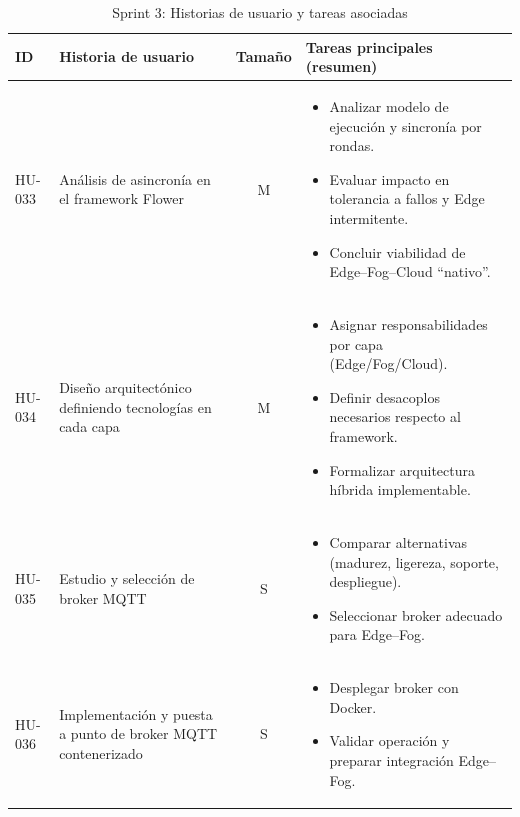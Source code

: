 \documentclass{report}
\begin{document}
\begin{table}[H]
\centering
\footnotesize
\caption{Sprint 3: Historias de usuario y tareas asociadas}
\label{tab:sprint3}
\renewcommand{\arraystretch}{1.25}
\setlength{\tabcolsep}{4pt}

\begin{tabular}{|l|p{4.6cm}|c|p{5.8cm}|}
\hline
\textbf{ID} & \textbf{Historia de usuario} & \textbf{Tamaño} & \textbf{Tareas principales (resumen)} \\ \hline

HU-033 &
Análisis de asincronía en el framework Flower &
M &
\begin{itemize}\setlength\itemsep{0.2em}
  \item Analizar modelo de ejecución y sincronía por rondas.
  \item Evaluar impacto en tolerancia a fallos y Edge intermitente.
  \item Concluir viabilidad de Edge--Fog--Cloud ``nativo''.
\end{itemize}
\\ \hline

HU-034 &
Diseño arquitectónico definiendo tecnologías en cada capa &
M &
\begin{itemize}\setlength\itemsep{0.2em}
  \item Asignar responsabilidades por capa (Edge/Fog/Cloud).
  \item Definir desacoplos necesarios respecto al framework.
  \item Formalizar arquitectura híbrida implementable.
\end{itemize}
\\ \hline

HU-035 &
Estudio y selección de broker MQTT &
S &
\begin{itemize}\setlength\itemsep{0.2em}
  \item Comparar alternativas (madurez, ligereza, soporte, despliegue).
  \item Seleccionar broker adecuado para Edge--Fog.
\end{itemize}
\\ \hline

HU-036 &
Implementación y puesta a punto de broker MQTT contenerizado &
S &
\begin{itemize}\setlength\itemsep{0.2em}
  \item Desplegar broker con Docker.
  \item Validar operación y preparar integración Edge--Fog.
\end{itemize}
\\ \hline
\end{tabular}
\end{table}
\end{document}
